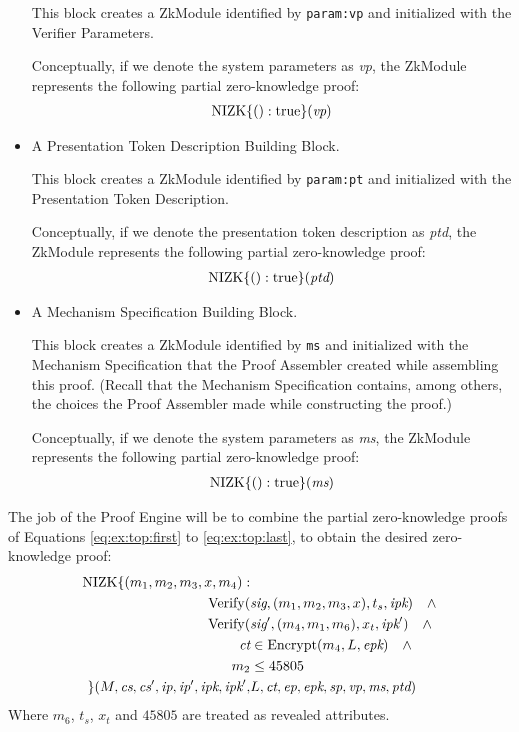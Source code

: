 \begin{itemize}
This block creates a ZkModule identified by \texttt{param:vp} and initialized
with the Verifier Parameters.

Conceptually, if we denote the system parameters as \emph{vp}, the ZkModule represents
the following partial zero-knowledge proof:
\begin{align}
\operatorname{NIZK}\lbrace(): \operatorname{true}\rbrace(\emph{vp})
\end{align}

\item A Presentation Token Description Building Block.

This block creates a ZkModule identified by \texttt{param:pt} and initialized
with the Presentation Token Description.

Conceptually, if we denote the presentation token description as \emph{ptd}, the ZkModule represents
the following partial zero-knowledge proof:
\begin{align}
\operatorname{NIZK}\lbrace(): \operatorname{true}\rbrace(\emph{ptd})
\end{align}

\item A Mechanism Specification Building Block.

This block creates a ZkModule identified by \texttt{ms} and initialized with the
Mechanism Specification that the Proof Assembler created while assembling this proof.
(Recall that the Mechanism Specification
contains, among others, the choices the Proof
Assembler made while constructing the proof.)

Conceptually, if we denote the system parameters as \emph{ms}, the ZkModule represents
the following partial zero-knowledge proof:
\begin{align}
\operatorname{NIZK}\lbrace(): \operatorname{true}\rbrace(\emph{ms})
\label{eq:ex:top:last}
\end{align}

\end{itemize}

The job of the Proof Engine will be to combine the partial zero-knowledge proofs of Equations
\ref{eq:ex:top:first} to
\ref{eq:ex:top:last}, to obtain the desired zero-knowledge proof:
\begin{align}
\operatorname{NIZK}\lbrace(
m_1, m_2, m_3, x, m_4
):& \nonumber\\
\operatorname{Verify}(&\emph{sig}, (m_1, m_2, m_3, x), t_s, \emph{ipk}) \quad \wedge \nonumber\\
\operatorname{Verify}(&\emph{sig}', (m_4, m_1, m_6), x_t, \emph{ipk}') \quad \wedge \nonumber\\
\emph{ct} &\in \operatorname{Encrypt}(m_4, L, \emph{epk}) \quad \wedge \nonumber\\
m_2 &\leq 45805 \nonumber\\
\rbrace(
M, \emph{cs}, \emph{cs}', \emph{ip}, \emph{ip}', \emph{ipk}, \emph{ipk}', &L, \emph{ct}, \emph{ep}, \emph{epk}, \emph{sp}, \emph{vp}, \emph{ms}, \emph{ptd}
)
\end{align}
Where $m_6$, $t_s$, $x_t$ and $45805$ are treated as revealed attributes.

